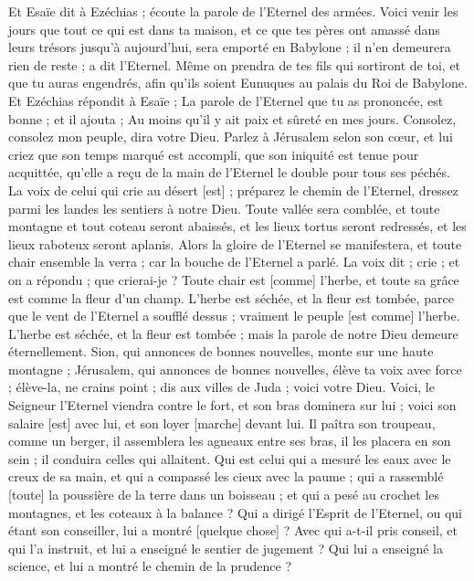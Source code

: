 \begin{multicols}{2}
Et Esaïe dit à Ezéchias ; écoute la parole de l'Eternel des armées.
Voici venir les jours que tout ce qui est dans ta maison, et ce que tes pères ont amassé dans leurs trésors jusqu'à aujourd'hui, sera emporté en Babylone ; il n'en demeurera rien de reste ; a dit l'Eternel.
Même on prendra de tes fils qui sortiront de toi, et que tu auras engendrés, afin qu'ils soient Eunuques au palais du Roi de Babylone.
Et Ezéchias répondit à Esaïe ; La parole de l'Eternel que tu as prononcée, est bonne ; et il ajouta ; Au moins qu'il y ait paix et sûreté en mes jours.
\VerseOne{}Consolez, consolez mon peuple, dira votre Dieu.
Parlez à Jérusalem selon son cœur, et lui criez que son temps marqué est accompli, que son iniquité est tenue pour acquittée, qu'elle a reçu de la main de l'Eternel le double pour tous ses péchés.
La voix de celui qui crie au désert [est] ; préparez le chemin de l'Eternel, dressez parmi les landes les sentiers à notre Dieu.
Toute vallée sera comblée, et toute montagne et tout coteau seront abaissés, et les lieux tortus seront redressés, et les lieux raboteux seront aplanis.
Alors la gloire de l'Eternel se manifestera, et toute chair ensemble la verra ; car la bouche de l'Eternel a parlé.
La voix dit ; crie ; et on a répondu ; que crierai-je ? Toute chair est [comme] l'herbe, et toute sa grâce est comme la fleur d'un champ.
L'herbe est séchée, et la fleur est tombée, parce que le vent de l'Eternel a soufflé dessus ; vraiment le peuple [est comme] l'herbe.
L'herbe est séchée, et la fleur est tombée ; mais la parole de notre Dieu demeure éternellement.
Sion, qui annonces de bonnes nouvelles, monte sur une haute montagne ; Jérusalem, qui annonces de bonnes nouvelles, élève ta voix avec force ; élève-la, ne crains point ; dis aux villes de Juda ; voici votre Dieu.
Voici, le Seigneur l'Eternel viendra contre le fort, et son bras dominera sur lui ; voici son salaire [est] avec lui, et son loyer [marche] devant lui.
Il paîtra son troupeau, comme un berger, il assemblera les agneaux entre ses bras, il les placera en son sein ; il conduira celles qui allaitent.
Qui est celui qui a mesuré les eaux avec le creux de sa main, et qui a compassé les cieux avec la paume ; qui a rassemblé [toute] la poussière de la terre dans un boisseau ; et qui a pesé au crochet les montagnes, et les coteaux à la balance ?
Qui a dirigé l'Esprit de l'Eternel, ou qui étant son conseiller, lui a montré [quelque chose] ?
Avec qui a-t-il pris conseil, et qui l'a instruit, et lui a enseigné le sentier de jugement ? Qui lui a enseigné la science, et lui a montré le chemin de la prudence ?

\end{multicols}
